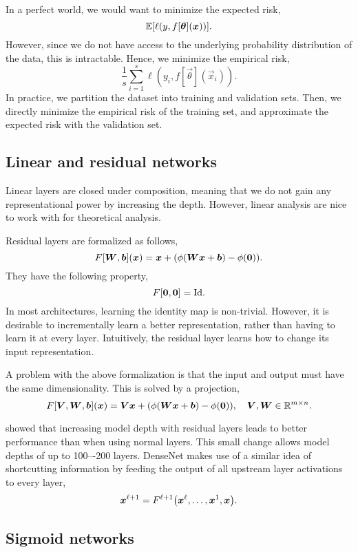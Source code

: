 In a perfect world, we would want to minimize the expected risk, \[
    \mathbb{E}[\ell(y, f[\bm{\theta}](\bm{x}))].
\]
However, since we do not have access to the underlying probability distribution of the data, this
is intractable. Hence, we minimize the empirical risk, \[
    \frac{1}{s} \sum_{i=1}^{s} \ell(y_i, f[\vec{\theta}](\vec{x}_i)).
\]
In practice, we partition the dataset into training and validation sets. Then, we directly minimize
the empirical risk of the training set, and approximate the expected risk with the validation set.

\subsection{Linear and residual networks}

Linear layers are closed under composition, meaning that we do not gain any representational power
by increasing the depth. However, linear analysis are nice to work with for theoretical analysis.

Residual layers are formalized as follows, \[
    F[\bm{W}, \bm{b}](\bm{x}) = \bm{x} + (\phi(\bm{W} \bm{x} + \bm{b}) - \phi(\bm{0})).
\]
They have the following property, \[
    F[\bm{0}, \bm{0}] = \mathrm{Id}.
\]
In most architectures, learning the identity map is non-trivial. However, it is desirable to
incrementally learn a better representation, rather than having to learn it at every layer.
Intuitively, the residual layer learns how to change its input representation.

A problem with the above formalization is that the input and output must have the same
dimensionality. This is solved by a projection, \[
    F[\bm{V}, \bm{W}, \bm{b}](\bm{x}) = \bm{V} \bm{x} + (\phi(\bm{W} \bm{x} + \bm{b}) - \phi(\bm{0})), \quad \bm{V}, \bm{W} \in \mathbb{R}^{m\times n}.
\]

\citet{he2016deep} showed that increasing model depth with residual layers leads to better
performance than when using normal layers. This small change allows model depths of up to 100–-200
layers. DenseNet \citet{zhu2017densenet} makes use of a similar idea of shortcutting information by
feeding the output of all upstream layer activations to every layer, \[
    \vec{x}^{\ell+1} = F^{\ell+1}\lft( \vec{x}^\ell, \ldots, \vec{x}^1, \vec{x} \rgt).
\]

\subsection{Sigmoid networks}

